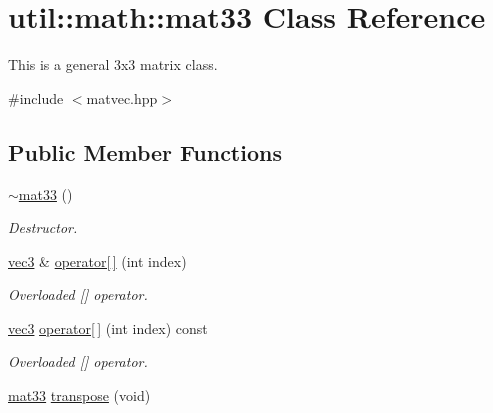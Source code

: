 \hypertarget{classutil_1_1math_1_1mat33}{\section{util\-:\-:math\-:\-:mat33 \-Class \-Reference}
\label{classutil_1_1math_1_1mat33}
}


\-This is a general 3x3 matrix class.  




{\ttfamily \#include $<$matvec.\-hpp$>$}

\subsection*{\-Public \-Member \-Functions}
\begin{DoxyCompactItemize}
\item 
\hypertarget{classutil_1_1math_1_1mat33_a833247977b36449f4d7a608131aeedb3}{\hyperlink{classutil_1_1math_1_1mat33_a833247977b36449f4d7a608131aeedb3}{$\sim$mat33} ()}\label{classutil_1_1math_1_1mat33_a833247977b36449f4d7a608131aeedb3}

\begin{DoxyCompactList}\small\item\em \-Destructor. \end{DoxyCompactList}\item 
\hypertarget{classutil_1_1math_1_1mat33_aae87588948ff698c5b9b0c4d33274aac}{\hyperlink{classutil_1_1math_1_1vec3}{vec3} \& \hyperlink{classutil_1_1math_1_1mat33_aae87588948ff698c5b9b0c4d33274aac}{operator\mbox{[}$\,$\mbox{]}} (int index)}\label{classutil_1_1math_1_1mat33_aae87588948ff698c5b9b0c4d33274aac}

\begin{DoxyCompactList}\small\item\em \-Overloaded \mbox{[}\mbox{]} operator. \end{DoxyCompactList}\item 
\hypertarget{classutil_1_1math_1_1mat33_adbeb70a11f8184d4a74731e3712d7460}{\hyperlink{classutil_1_1math_1_1vec3}{vec3} \hyperlink{classutil_1_1math_1_1mat33_adbeb70a11f8184d4a74731e3712d7460}{operator\mbox{[}$\,$\mbox{]}} (int index) const }\label{classutil_1_1math_1_1mat33_adbeb70a11f8184d4a74731e3712d7460}

\begin{DoxyCompactList}\small\item\em \-Overloaded \mbox{[}\mbox{]} operator. \end{DoxyCompactList}\item 
\hypertarget{classutil_1_1math_1_1mat33_a4e5702e23061356eeb8272478fe092f7}{\hyperlink{classutil_1_1math_1_1mat33}{mat33} \hyperlink{classutil_1_1math_1_1mat33_a4e5702e23061356eeb8272478fe092f7}{transpose} (void)}\label{classutil_1_1math_1_1mat33_a4e5702e23061356eeb8272478fe092f7}


\end{DoxyCompactItemize}
